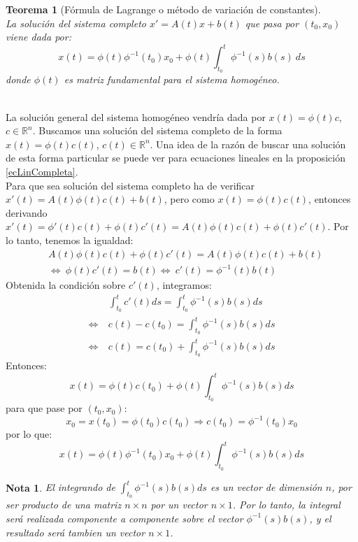 \documentclass[11pt, a4paper,twoside]{article}
\makeatletter
\theoremstyle{theorem-style}  %
\newtheorem{theorem}{Teorema}[section]  %
\renewenvironment{proof}[1][\proofname]{\par
	\pushQED{\qed}%
	\normalfont \topsep6\p@\@plus6\p@\relax
	\list{}{%
		\settowidth{\leftmargin}{\quad:\hskip\labelsep}%
		\setlength{\labelwidth}{0pt}%
		\setlength{\itemindent}{-\leftmargin}%
	}%
	\item[\hskip\labelsep\itshape#1\@addpunct{:}]\ignorespaces
}{%
	\popQED\endlist\@endpefalse
}
\theoremstyle{definition-style}
\newtheorem*{note}{Nota} %
\theoremstyle{example-style}
\makeatother
\begin{document}
\begin{theorem}[Fórmula de Lagrange o método de variación de constantes]\label{lagrange-formula}\ \\
	La solución del sistema completo $x' = A(t)x + b(t)$ que pasa por $(t_0, x_0)$ viene dada por:
	\[x(t) = \phi(t) \phi^{-1}(t_0) x_0 + \phi(t)\int_{t_0}^{t} \phi^{-1}(s) b(s) \ ds\]
	donde $\phi(t)$ es matriz fundamental para el sistema homogéneo.
\end{theorem}
\begin{proof}\ \\
	La solución general del sistema homogéneo vendría dada por $x(t) = \phi (t) c$, $c \in \mathbb{R}^n$. Buscamos una solución del sistema completo de la forma $x(t) = \phi (t) c(t)$, $c(t) \in \mathbb{R}^n$. Una idea de la razón de buscar una solución de esta forma particular se puede ver para ecuaciones lineales en la proposición \ref{ecLinCompleta}.\\
	Para que sea solución del sistema completo ha de verificar $ x'(t)=A(t)\phi(t)c(t)+b(t) $, pero como $ x(t)=  \phi (t) c(t) $, entonces derivando $ x'(t)= \phi'(t)c(t) + \phi(t)c'(t)=A(t)\phi(t)c(t) + \phi(t)c'(t)$. Por lo tanto, tenemos la igualdad:
	\begin{align*}
		&A(t)\phi(t)c(t) + \phi(t)c'(t)= A(t)\phi(t)c(t) + b(t) \\
		&\Leftrightarrow \ \phi(t)c'(t) = b(t) \Leftrightarrow \ c'(t) = \phi^{-1}(t) b(t)
	\end{align*}
	Obtenida la condición sobre $ c'(t) $, integramos:
	\begin{align*}
	& \int_{t_0}^{t} c'(t) ds = \int_{t_0}^{t} \phi^{-1}(s) b(s) ds\\
	\Leftrightarrow \ &c(t) - c(t_0) = \int_{t_0}^{t} \phi^{-1}(s) b(s) ds\\
	\Leftrightarrow \ &c(t) = c(t_0) + \int_{t_0}^{t} \phi^{-1}(s) b(s) ds
	\end{align*}
	Entonces:
	\[x(t) = \phi(t) c(t_0) + \phi(t) \int_{t_0}^{t} \phi^{-1}(s) b(s) ds\]
	para que pase por $(t_0, x_0)$:
	\[x_0 = x(t_0) = \phi (t_0) c(t_0) \Rightarrow c(t_0) = \phi^{-1}(t_0) x_0 \] 
	por lo que:
	\[x(t) = \phi(t) \phi^{-1}(t_0) x_0 + \phi(t) \int_{t_0}^{t} \phi^{-1}(s) b(s) ds\]
\end{proof}
\begin{note}
	El integrando de $ \int_{t_0}^{t} \phi^{-1}(s) b(s) ds $ es un vector de dimensión $ n $, por ser producto de una matriz $ n\times n $ por un vector  $ n\times 1 $. Por lo tanto, la integral será realizada componente a componente sobre el vector $ \phi^{-1}(s) b(s) $, y el resultado será tambien un vector $ n\times 1 $.
\end{note}
\end{document}
